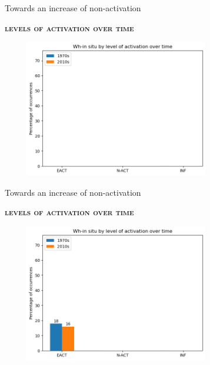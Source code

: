 \documentclass[lesson_slides]{subfiles}
\begin{document}
\begin{frame}[c]{Towards an increase of non-activation}

    \textbf{\textsc{levels of activation over time}} \pause
    \begin{center}
        \includegraphics[width=10cm, height=6cm]{images/activationsempty.png}
    \end{center}
  
\end{frame}
\begin{frame}[c]{Towards an increase of non-activation}

    \textbf{\textsc{levels of activation over time}}
    \begin{center}
        \includegraphics[width=10cm, height=6cm]{images/activations1.png}
    \end{center}
  
\end{frame}
\end{document}
